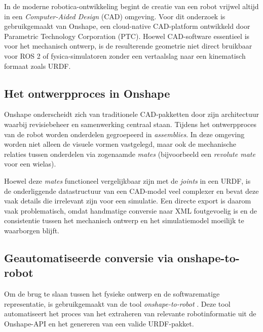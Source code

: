 In de moderne robotica-ontwikkeling begint de creatie van een robot vrijwel altijd in een \textit{Computer-Aided Design} (CAD) omgeving. Voor dit onderzoek is gebruikgemaakt van Onshape, een cloud-native CAD-platform ontwikkeld door Parametric Technology Corporation (PTC). Hoewel CAD-software essentieel is voor het mechanisch ontwerp, is de resulterende geometrie niet direct bruikbaar voor ROS 2 of fysica-simulatoren zonder een vertaalslag naar een kinematisch formaat zoals URDF.
\subsection{Het ontwerpproces in Onshape}
Onshape onderscheidt zich van traditionele CAD-pakketten door zijn architectuur waarbij revisiebeheer en samenwerking centraal staan. Tijdens het ontwerpproces van de robot worden onderdelen gegroepeerd in \textit{assemblies}. In deze omgeving worden niet alleen de visuele vormen vastgelegd, maar ook de mechanische relaties tussen onderdelen via zogenaamde \textit{mates} (bijvoorbeeld een \textit{revolute mate} voor een wielas).

Hoewel deze \textit{mates} functioneel vergelijkbaar zijn met de \textit{joints} in een URDF, is de onderliggende datastructuur van een CAD-model veel complexer en bevat deze vaak details die irrelevant zijn voor een simulatie. Een directe export is daarom vaak problematisch, omdat handmatige conversie naar XML foutgevoelig is en de consistentie tussen het mechanisch ontwerp en het simulatiemodel moeilijk te waarborgen blijft.

\subsection{Geautomatiseerde conversie via onshape-to-robot}
Om de brug te slaan tussen het fysieke ontwerp en de softwarematige representatie, is gebruikgemaakt van de tool \textit{onshape-to-robot} \autocite{Rhoban2025}. Deze tool automatiseert het proces van het extraheren van relevante robotinformatie uit de Onshape-API en het genereren van een valide URDF-pakket.

